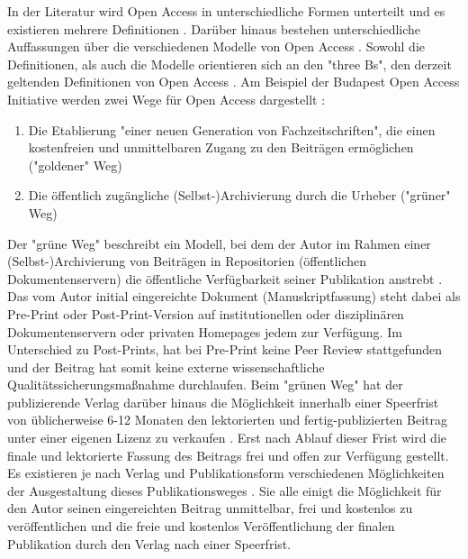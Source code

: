In der Literatur wird Open Access in unterschiedliche Formen unterteilt und es existieren mehrere Definitionen \cite{CREATe_2014} \cite{albert_2006_open_implications}. Darüber hinaus bestehen unterschiedliche Auffassungen über die verschiedenen Modelle von Open Access \cite{CREATe_2014} \cite{cite:22b} \cite{lewis_2012_inevitability}. Sowohl die Definitionen, als auch die Modelle orientieren sich an den "three Bs", den derzeit geltenden Definitionen von Open Access \cite{Adema_2014_open_access}. Am Beispiel der Budapest Open Access Initiative werden zwei Wege für Open Access dargestellt \cite{albert_2006_open_implications}:
\begin{enumerate}
\item Die Etablierung "einer neuen Generation von Fachzeitschriften", die einen kostenfreien und unmittelbaren Zugang zu den Beiträgen ermöglichen ("goldener" Weg)
\item Die öffentlich zugängliche (Selbst-)Archivierung durch die Urheber ("grüner" Weg)
\end{enumerate}

Der "grüne Weg" beschreibt ein Modell, bei dem der Autor im Rahmen einer (Selbst-)Archivierung von Beiträgen in Repositorien (öffentlichen Dokumentenservern) die öffentliche Verfügbarkeit seiner Publikation anstrebt \cite{muller_2010_open}. Das vom Autor initial eingereichte Dokument (Manuskriptfassung) steht dabei als Pre-Print oder Post-Print-Version auf institutionellen oder disziplinären Dokumentenservern \cite{suchen} oder privaten Homepages \cite{suchen} jedem zur Verfügung. Im Unterschied zu Post-Prints, hat bei Pre-Print keine Peer Review stattgefunden \cite{suchen} und der Beitrag hat somit keine externe wissenschaftliche Qualitätssicherungsmaßnahme durchlaufen. Beim "grünen Weg" hat der publizierende Verlag darüber hinaus die Möglichkeit innerhalb einer Speerfrist von üblicherweise 6-12 Monaten \cite{suchen} den lektorierten und fertig-publizierten Beitrag unter einer eigenen Lizenz zu verkaufen \cite{suchen}. Erst nach Ablauf dieser Frist wird die finale und lektorierte Fassung des Beitrags frei und offen zur Verfügung gestellt. Es existieren je nach Verlag und Publikationsform verschiedenen Möglichkeiten der Ausgestaltung dieses Publikationsweges \cite{suchen}. Sie alle einigt die Möglichkeit für den Autor seinen eingereichten Beitrag unmittelbar, frei und kostenlos zu veröffentlichen und die freie und kostenlos Veröffentlichung der finalen Publikation durch den Verlag nach einer Speerfrist.

